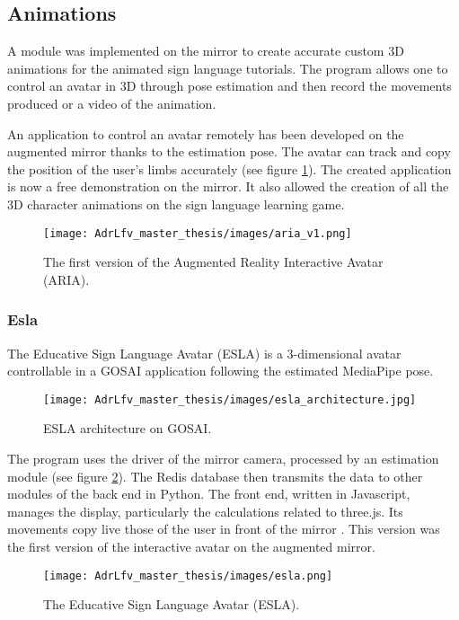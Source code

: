 \subsection{Animations}

A module was implemented on the mirror to create accurate custom 3D animations for the animated sign language tutorials. The program allows one to control an avatar in 3D through pose estimation and then record the movements produced or a video of the animation.

An application to control an avatar remotely has been developed on the augmented mirror thanks to the estimation pose. The avatar can track and copy the position of the user's limbs accurately (see figure \ref{fig:aria_v1}). The created application is now a free demonstration on the mirror. It also allowed the creation of all the 3D character animations on the sign language learning game.

\begin{figure}[h]
    \centering
    \texttt{[image: AdrLfv\_master\_thesis/images/aria\_v1.png]}
    \caption{The first version of the Augmented Reality Interactive Avatar (ARIA).}
    \label{fig:aria_v1}
\end{figure}

\subsubsection{Esla}

The Educative Sign Language Avatar (ESLA) is a 3-dimensional avatar controllable in a GOSAI application following the estimated MediaPipe pose. 

\begin{figure}[h]
    \centering
    \texttt{[image: AdrLfv\_master\_thesis/images/esla\_architecture.jpg]}
    \caption{ESLA architecture on GOSAI.}
    \label{fig:esla_architecture}
\end{figure}

The program uses the driver of the mirror camera, processed by an estimation module (see figure \ref{fig:esla_architecture}). The Redis database then transmits the data to other modules of the back end in Python. The front end, written in Javascript, manages the display, particularly the calculations related to three.js. Its movements copy live those of the user in front of the mirror \cite{esla}. This version was the first version of the interactive avatar on the augmented mirror.


\begin{figure}[h]
    \centering
    \texttt{[image: AdrLfv\_master\_thesis/images/esla.png]}
    \caption{The Educative Sign Language Avatar (ESLA).}
    \label{fig:esla}
\end{figure}


